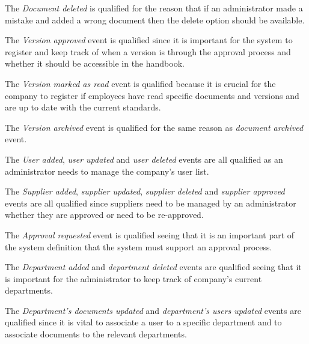 
The \textit{Document deleted} is qualified for the reason that if an administrator made a mistake and added a wrong document then the delete option should be available.

The \textit{Version approved} event is qualified since it is important for the system to register and keep track of when a version is through the approval process and whether it should be accessible in the handbook.

The \textit{Version marked as read} event is qualified because it is crucial for the company to register if employees have read specific documents and versions and are up to date with the current standards.

The \textit{Version archived} event is qualified for the same reason as \textit{document archived} event.

The \textit{User added}, \textit{user updated} and \textit{user deleted} events are all qualified as an administrator needs to manage the company's user list.

The \textit{Supplier added}, \textit{supplier updated},  \textit{supplier deleted} and \textit{supplier approved} events are all qualified since suppliers need to be managed by an administrator whether they are approved or need to be re-approved.

The \textit{Approval requested} event is qualified seeing that it is an important part of the system definition that the system must support an approval process.

The \textit{Department added} and \textit{department deleted} events are qualified seeing that it is important for the administrator to keep track of company's current departments.

The \textit{Department's documents updated} and \textit{department's users updated} events are qualified since it is vital to associate a user to a specific department and to associate documents to the relevant departments.

